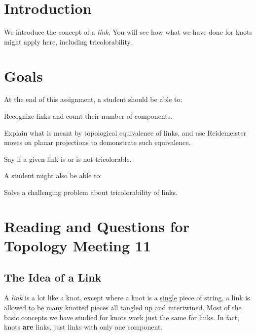 \documentclass[12pt,letterpaper]{article}
\theoremstyle{definition}
\begin{document}
\setlength{\parskip}{1ex plus 0.5ex minus 0.2ex}
\setlength{\parindent}{0pt}

\pagestyle{fancy}
\cfoot{}

\section*{Introduction}
We introduce the concept of a \emph{link}. 
You will see how what we have done for knots might apply here, including tricolorability. 

\section*{Goals}
At the end of this assignment, a student should be able to:
\begin{compactitem}
\item Recognize links and count their number of components.
\item Explain what is meant by topological equivalence of links, and use Reidemeister moves on planar projections to demonstrate such equivalence.
\item Say if a given link is or is not tricolorable.
\end{compactitem}
A student might also be able to:
\begin{compactitem}
\item Solve a challenging problem about tricolorability of links.
\end{compactitem}

\section*{Reading and Questions for Topology Meeting 11}

\subsection*{The Idea of a Link}

A \emph{link} is a lot like a knot, except where a knot is a \underline{single} piece of string, a link is allowed to be \underline{many} knotted pieces all tangled up and intertwined.
Most of the basic concepts we have studied for knots work just the same for links.
In fact, knots \textbf{are} links, just links with only one component.
\end{document}

